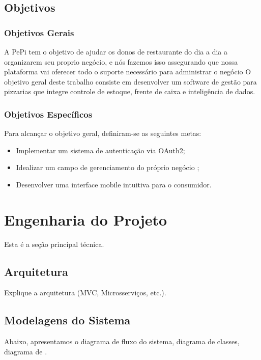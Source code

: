 \documentclass[12pt, a4paper]{article}
\begin{document}
\newpage 

\subsection{Objetivos}

\subsubsection{Objetivos Gerais}
A PePi tem o objetivo de ajudar os donos de restaurante do dia a dia a organizarem seu proprio negócio, e nós fazemos isso assegurando que nossa plataforma vai oferecer todo o suporte necessário para administrar o negócio
O objetivo geral deste trabalho consiste em desenvolver um software de gestão para pizzarias que integre controle de estoque, frente de caixa e inteligência de dados.

\subsubsection{Objetivos Específicos}
Para alcançar o objetivo geral, definiram-se as seguintes metas:
\begin{itemize}
    \item Implementar um sistema de autenticação via OAuth2;
    \item Idealizar um campo de gerenciamento do próprio negócio ; 
    \item Desenvolver uma interface mobile intuitiva para o consumidor.
\end{itemize}

\newpage


\section{Engenharia do Projeto}
Esta é a seção principal técnica.

\subsection{Arquitetura}
Explique a arquitetura (MVC, Microsserviços, etc.).


\subsection{Modelagens do Sistema}
Abaixo, apresentamos o diagrama de fluxo do sistema, diagrama de classes, diagrama de .


\newpage
\end{document}
